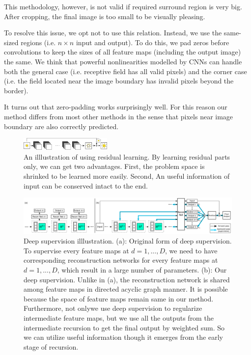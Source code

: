 \documentclass[10pt,twocolumn,letterpaper]{article}
\begin{document}
This methodology, however, is not valid if required surround region is very big. After cropping, the final image is too small to be visually pleasing.

To resolve this issue, we opt not to use this relation. Instead, we use the same-sized regions (i.e. $n\times n$ input and output). To do this, we pad zeros before convolutions to keep the sizes of all feature maps (including the output image) the same. We think that powerful nonlinearities modelled by CNNs can handle both the general case (i.e. receptive field has all valid pixels) and the corner case (i.e. the field located near the image boundary has invalid pixels beyond the border).

It turns out that zero-padding works surprisingly well. For this reason our method differs from most other methods in the sense that pixels near image boundary are also correctly predicted. 

\begin{figure}
\begin{center}
	\includegraphics[width=0.4\textwidth]{figs/f4}
	\caption{An illlustration of using residual learning. By learning residual parts only, we can get two advantages. First, the problem space is shrinked to be learned more easily. Second, An useful information of input can be conserved intact to the end.}
\end{center}
\end{figure}

\begin{figure}
\begin{center}
	\includegraphics[width=\textwidth]{figs/f3}
	\caption{Deep supervision illlustration. (a): Original form of deep supervision. To supervise every feature maps at $d = 1, ..., D$, we need to have corresponding reconstruction networks for every feature maps at $d = 1, ..., D$, which result in a large number of parameters. (b): Our deep supervision. Unlike in (a), the reconstruction network is shared among feature maps in directed acyclic graph manner. It is possible because the space of feature maps remain same in our method. Furthermore, not onlywe use deep supervision to regularize intermediate feature maps, but we use all the outputs from the intermediate recursion to get the final output by weighted sum. So we can utilize useful information though it emerges from the early stage of recursion.}
\end{center}
\end{figure}
\end{document}
